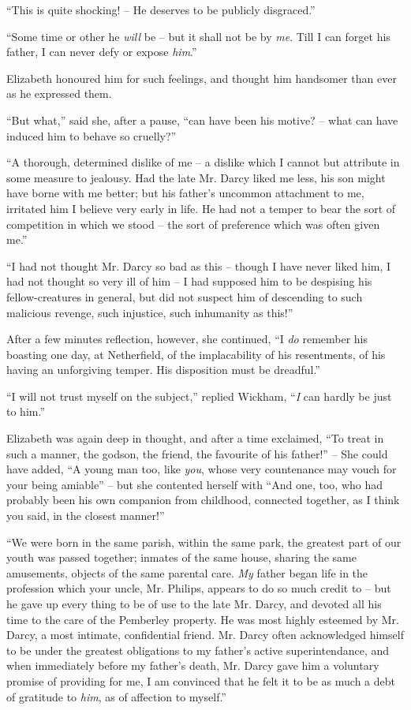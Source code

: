 “This is quite shocking! -- He deserves to be publicly
disgraced.”

“Some time or other he \textit{will} be -- but it shall not be
by \textit{me}. Till I can forget his father, I can never defy or
expose \textit{him}.”

Elizabeth honoured him for such feelings, and thought
him handsomer than ever as he expressed them.

“But what,” said she, after a pause, “can have been
his motive? -- what can have induced him to behave so
cruelly?”

“A thorough, determined dislike of me -- a dislike which
I cannot but attribute in some measure to jealousy. Had
the late Mr. Darcy liked me less, his son might have borne
with me better; but his father’s uncommon attachment
to me, irritated him I believe very early in life. He had
not a temper to bear the sort of competition in which we
stood -- the sort of preference which was often given me.”

“I had not thought Mr. Darcy so bad as this -- though
I have never liked him, I had not thought so very ill of
him -- I had supposed him to be despising his fellow-creatures
in general, but did not suspect him of descending
to such malicious revenge, such injustice, such inhumanity
as this!”

After a few minutes reflection, however, she continued,
“I \textit{do} remember his boasting one day, at Netherfield, of
the implacability of his resentments, of his having an
unforgiving temper. His disposition must be dreadful.”

“I will not trust myself on the subject,” replied Wickham,
“\textit{I} can hardly be just to him.”

Elizabeth was again deep in thought, and after a time
exclaimed, “To treat in such a manner, the godson, the
friend, the favourite of his father!” -- She could have
added, “A young man too, like \textit{you}, whose very
countenance may vouch for your being amiable” -- but she
contented herself with “And one, too, who had probably
been his own companion from childhood, connected
together, as I think you said, in the closest manner!”

“We were born in the same parish, within the same
park, the greatest part of our youth was passed together;
inmates of the same house, sharing the same amusements,
objects of the same parental care. \textit{My} father began life
in the profession which your uncle, Mr. Philips, appears
to do so much credit to -- but he gave up every thing to
be of use to the late Mr. Darcy, and devoted all his time
to the care of the Pemberley property. He was most
highly esteemed by Mr. Darcy, a most intimate, confidential
friend. Mr. Darcy often acknowledged himself to
be under the greatest obligations to my father’s active
superintendance, and when immediately before my father’s
death, Mr. Darcy gave him a voluntary promise of providing
for me, I am convinced that he felt it to be as much
a debt of gratitude to \textit{him}, as of affection to myself.”

